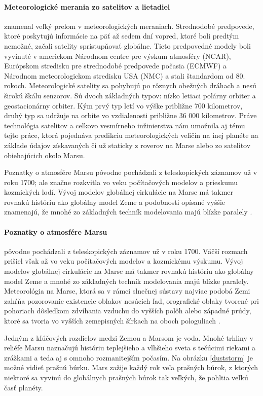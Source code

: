 \paragraph{Meteorologické merania zo satelitov a lietadiel} znamenal veľký prelom v meteorologických meraniach. Strednodobé predpovede, ktoré poskytujú informácie na päť až sedem dní vopred, ktoré boli predtým nemožné, začali satelity sprístupňovať globálne. Tieto predpovedné modely boli vyvinuté v americkom Národnom centre pre výskum atmosféry (NCAR), Európskom stredisku pre strednodobé predpovede počasia (ECMWF) a Národnom meteorologickom stredisku USA (NMC) a stali štandardom od 80. rokoch. Meteorologické satelity sa pohybujú po rôznych obežných dráhach a nesú širokú škálu senzorov. Sú dvoch základných typov: nízko letiaci polárny orbiter a geostacionárny orbiter. Kým prvý typ letí vo výške približne 700 kilometrov, druhý typ sa udržuje na orbite vo vzdialenosti približne 36 000 kilometrov. Práve technológia satelitov a celkovo vesmírneho inžinierstva nám umožnila aj tému tejto práce, ktorá pojednáva predikciu meteorologických veličín na inej planéte na základe údajov získavaných či už staticky z roverov na Marse alebo zo satelitov obiehajúcich okolo Marsu.

Poznatky o atmosfére Marsu pôvodne pochádzali z teleskopických záznamov už v roku 1700; ale značne rozkvitla vo veku počítačových modelov a prieskumu kozmických lodí. Vývoj modelov globálnej cirkulácie na Marse má takmer rovnakú históriu ako globálny model Zeme a podobnosti opísané vyššie znamenajú, že mnohé zo základných techník modelovania majú blízke paralely \cite{meteo}.


\paragraph{Poznatky o atmosfére Marsu} pôvodne pochádzali z teleskopických záznamov už v roku 1700. Väčší rozmach prišiel však až vo veku počítačových modelov a kozmickému výskumu. Vývoj modelov globálnej cirkulácie na Marse má takmer rovnakú históriu ako globálny model Zeme a mnohé zo základných techník modelovania majú blízke paralely. Meteorológia na Marse, ktorá sa v rámci slnečnej sústavy najviac podobá Zemi zahŕňa pozorovanie existencie oblakov nesúcich ľad, orografické oblaky tvorené pri pohoriach dôsledkom zdvíhania vzduchu do vyšších polôh alebo západné prúdy, ktoré sa tvoria vo vyšších zemepisných šírkach na oboch pologuliach \cite{meteo}.

Jedným z kľúčových rozdielov medzi Zemou a Marsom je voda. Mnohé trhliny v reliéfe Marsu naznačujú históriu teplejšieho a vlhšieho sveta s tečúcimi riekami a zrážkami a teda aj s omnoho rozmanitejším počasím. Na obrázku \ref{duststorm} je možné vidieť prašnú búrku. Mars zažije každý rok veľa prašných búrok, z ktorých niektoré sa vyvinú do globálnych prašných búrok tak veľkých, že pohltia veľkú časť planéty.


